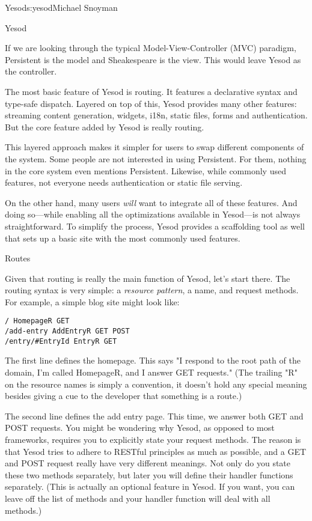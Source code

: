 \begin{aosachapter}{Yesod}{s:yesod}{Michael Snoyman}
\begin{aosasect1}{Yesod}

If we are looking through the typical Model-View-Controller (MVC)
paradigm, Persistent is the model and Sheakespeare is the view. This
would leave Yesod as the controller.

The most basic feature of Yesod is routing. It features a declarative
syntax and type-safe dispatch. Layered on top of this, Yesod provides
many other features: streaming content generation, widgets, i18n,
static files, forms and authentication. But the core feature added by
Yesod is really routing.

This layered approach makes it simpler for users to swap different
components of the system. Some people are not interested in using
Persistent. For them, nothing in the core system even mentions
Persistent. Likewise, while commonly used features, not everyone needs
authentication or static file serving.

On the other hand, many users \emph{will} want to integrate all of
these features. And doing so---while enabling all the optimizations
available in Yesod---is not always straightforward. To simplify the
process, Yesod provides a scaffolding tool as well that sets up a
basic site with the most commonly used features.

\begin{aosasect2}{Routes}

Given that routing is really the main function of Yesod, let's start
there. The routing syntax is very simple: a \emph{resource pattern}, a
name, and request methods. For example, a simple blog site might look
like:

\begin{verbatim}
/ HomepageR GET
/add-entry AddEntryR GET POST
/entry/#EntryId EntryR GET
\end{verbatim}

The first line defines the homepage. This says "I respond to the root
path of the domain, I'm called HomepageR, and I answer GET requests."
(The trailing "R" on the resource names is simply a convention, it
doesn't hold any special meaning besides giving a cue to the developer
that something is a route.)

The second line defines the add entry page. This time, we answer both
GET and POST requests. You might be wondering why Yesod, as opposed to
most frameworks, requires you to explicitly state your request
methods. The reason is that Yesod tries to adhere to RESTful
principles as much as possible, and a GET and POST request really have
very different meanings. Not only do you state these two methods
separately, but later you will define their handler functions
separately. (This is actually an optional feature in Yesod. If you
want, you can leave off the list of methods and your handler function
will deal with all methods.)


\end{aosasect2}
\end{aosasect1}
\end{aosachapter}

